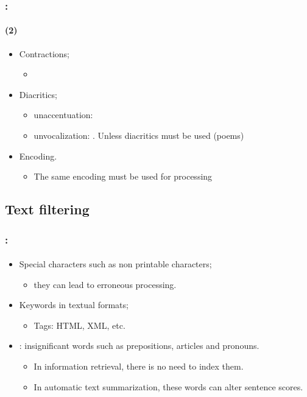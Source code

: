 \documentclass[xcolor=table]{beamer}
\begin{document}
\begin{frame}
	\frametitle{\insertshortsubtitle: \insertsection}
	\framesubtitle{\insertsubsection (2)}

	\begin{itemize}
		
		\item Contractions;
		\begin{itemize}
			\item {}
		\end{itemize}
		
		\item Diacritics;
		\begin{itemize}
			\item unaccentuation:  
			\item unvocalization:  . Unless diacritics must be used (poems)
		\end{itemize}
	
		\item Encoding.
		\begin{itemize}
			\item The same encoding must be used for processing
		\end{itemize}
	
	\end{itemize}

\end{frame}

\subsection{Text filtering}

\begin{frame}
	\frametitle{\insertshortsubtitle: \insertsection}
	\framesubtitle{\insertsubsection}

	\begin{itemize}
		\item Special characters such as non printable characters;
		\begin{itemize}
			\item they can lead to erroneous processing. 
		\end{itemize}
		\item Keywords in textual formats;
		\begin{itemize}
			\item Tags: HTML, XML, etc. 
		\end{itemize}
		\item {}: insignificant words such as prepositions, articles and pronouns.
		\begin{itemize}
			\item In information retrieval, there is no need to index them.
			\item In automatic text summarization, these words can alter sentence scores.
		\end{itemize}
	\end{itemize}

\end{frame}
\end{document}
